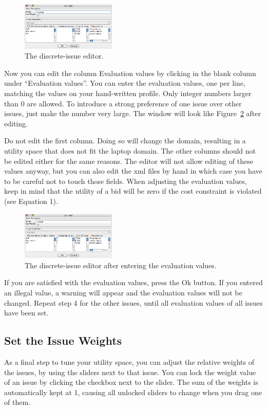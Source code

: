 \documentclass[]{article}
\begin{document}
\begin{figure}[htb]
	\centering
	\includegraphics[width=0.4\textwidth]{media/image9.png}
\caption{The discrete-issue editor.}\label{Fig:discrete issue editor}
\end{figure}

Now you can edit the column Evaluation values by clicking in the blank column under ``Evaluation values''. You can enter the evaluation values, one per line, matching the values on your hand-written profile. Only integer numbers larger than 0 are allowed. To introduce a strong preference of one issue over other issues, just make the number very large. The window will look like Figure~\ref{Fig:discrete issue editor edited} after editing.

Do not edit the first column. Doing so will change the domain, resulting in a utility space that does not fit the laptop domain. The other columns should not be edited either for the same reasons. The editor will not allow editing of these values anyway, but you can also edit the xml files by hand in which case you have to be careful not to touch those fields.
When adjusting the evaluation values, keep in mind that the utility of a bid will be zero if the cost constraint is violated (see Equation 1).

\begin{figure}[htb]
	\centering
	\includegraphics[width=0.4\textwidth]{media/image10.png}
\caption{The discrete-issue editor after entering the evaluation values.}\label{Fig:discrete issue editor edited}
\end{figure}

If you are satisfied with the evaluation values, press the Ok button. If you entered an illegal value, a warning will appear and the evaluation values will not be changed. Repeat step 4 for the other issues, until all evaluation values of all issues have been set.

\subsection{Set the Issue Weights}
As a final step to tune your utility space, you can adjust the relative weights of the issues, by using the sliders next to that issue. You can lock the weight value of an issue by clicking the checkbox next to the slider. The sum of the weights is automatically kept at 1, causing all unlocked sliders to change when you drag one of them.
\end{document}

